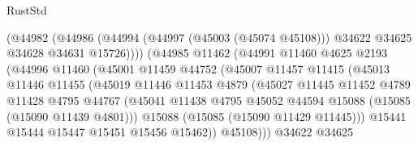 \begin{lexlean}{RustStd}
\begin{coremodule}
                              (@44982
                                (@44986
                                  (@44994
                                    (@44997 (@45003 (@45074 @45108)))
                                    @34622
                                    @34625
                                    @34628
                                    @34631
                                    @15726))))
                            (@44985
                              @11462
                              (@44991
                                @11460
                                @4625
                                @2193
                                (@44996
                                  @11460
                                  (@45001
                                    @11459
                                    @44752
                                    (@45007
                                      @11457
                                      @11415
                                      (@45013
                                        @11446
                                        @11455
                                        (@45019
                                          @11446
                                          @11453
                                          @4879
                                          (@45027
                                            @11445
                                            @11452
                                            @4789
                                            @11428
                                            @4795
                                            @44767
                                            (@45041
                                              @11438
                                              @4795
                                              @45052
                                              @44594
                                              @15088
                                              (@15085 (@15090 @11439 @4801)))
                                            @15088
                                            (@15085 (@15090 @11429 @11445)))
                                          @15441
                                          @15444
                                          @15447
                                          @15451
                                          @15456
                                          @15462))
                                      @45108)))
                                @34622
                                @34625

\end{coremodule}
\end{lexlean}

